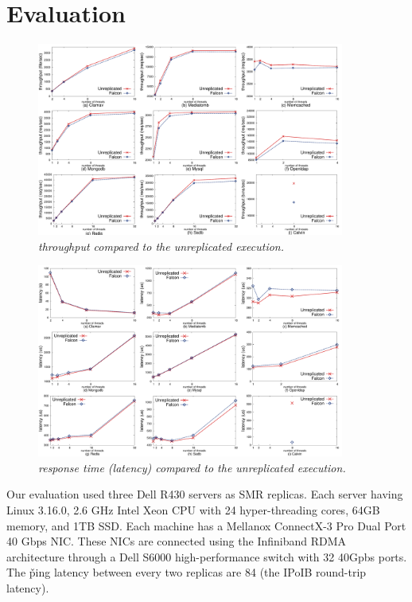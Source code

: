 \section{Evaluation} \label{sec:evaluation}

\begin{figure}[t]
\centering
\includegraphics[width=0.9\textwidth]{figures/throughput}
\vspace{-.10in}
\caption{\small {\em \xxx throughput compared to the unreplicated 
execution.}}
\label{fig:tput}
\end{figure}

\begin{figure}[t]
\centering
\includegraphics[width=0.9\textwidth]{figures/latency}
\vspace{-.10in}
\caption{\small {\em \xxx response time (latency) compared to the unreplicated 
execution.}}
\label{fig:latency}
\end{figure}

Our evaluation used three Dell R430 servers as SMR replicas. Each server having 
Linux 3.16.0, 2.6 GHz Intel Xeon CPU with 24 hyper-threading cores, 64GB 
memory, and 1TB SSD. Each machine has a Mellanox ConnectX-3 Pro Dual Port 40 
Gbps NIC. These NICs are connected using the Infiniband RDMA architecture 
through a Dell S6000 high-performance switch with 32 40Gpbs ports. The \v{ping} 
latency between every two replicas are 84 \us (the IPoIB round-trip latency).

